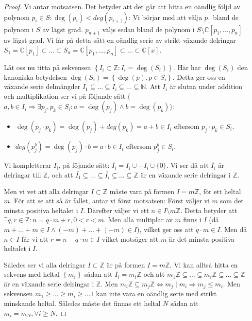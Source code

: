\begin{proof}
Vi antar motsatsen. Det betyder att det går att hitta en oändlig följd av polynom $p_i\in S:\deg(p_i)<deg(p_{i+1})$: Vi börjar med att välja $p_1$ bland de polynom i $S$ av lägst grad. $p_{n+1}$ väljs sedan bland de polynom i $S \setminus \mathbb{C}\left[p_1,\ldots,p_n\right]$ av lägst grad. Vi får på detta sätt en oändlig serie av strikt växande delringar $S_1=\mathbb{C}\left[p_1\right] \subset \ldots \subset S_n=\mathbb{C}\left[p_1,\ldots,p_n\right] \subset \ldots \subset \mathbb{C}\left[x\right]$.

Låt oss nu titta på sekvensen $\left\{I_i \subset \mathbb{Z}: I_i=\deg(S_i)\right\}$. Här har $\deg(S_i)$ den kanoniska betydelsen $\deg(S_i)=\left\{\deg(p), p \in S_i\right\}$. Detta ger oss en växande serie delmängder $I_1 \subseteq \ldots \subseteq I_i \subseteq \ldots \subseteq \mathbb{N}$. Att $I_i$ är slutna under addition och multiplikation ser vi på följande sätt ($a, b\in I_i \Longrightarrow \exists p_j, p_k \in S_i : a=\deg(p_j) \wedge b=\deg(p_k)$):

\begin{itemize}
\item $\deg(p_j \cdot p_k) = \deg(p_j)+deg(p_k) = a+b \in I_i$ eftersom $p_j \cdot p_k \in S_i$.

\item $deg(p_j^b) = \deg(p_j)\cdot b = a \cdot b \in I_i$ eftersom $p_j^b \in S_i$.
\end{itemize}

Vi kompletterar $I_i$, på föjande sätt: $\overline{I_i} = I_i \cup -I_i \cup \{0\}$. Vi ser då att $\overline{I_i}$ är delringar till $\mathbb{Z}$, och att $\overline{I_1} \subseteq \ldots \subseteq \overline{I_i} \subseteq \ldots \subseteq \mathbb{Z}$ är en växande serie delringar i $\mathbb{Z}$.

Men vi vet att alla delringar $I \subset \mathbb{Z}$ måste vara på formen $I=m\mathbb{Z}$, för ett heltal $m$. För att se att så är fallet, antar vi först motsatsen: Först väljer vi $m$ som det minsta positiva heltalet i $I$. Därefter väljer vi ett $n \in I\setminus m\mathbb{Z}$. Detta betyder att $\exists q, r \in \mathbb{Z}: n=q\cdot m + r, 0 < r < m$. Men alla multiplar av $m$ finns i $I$ (då $m+\ldots+m\in I \wedge (-m)+\ldots+(-m)\in I$), vilket ger oss att $q \cdot m \in I$. Men då $n\in I$ får vi att $r = n - q\cdot m \in I$ vilket motsäger att $m$ är det minsta positiva heltalet i $I$.

Således ser vi alla delringar $I \subset \mathbb{Z}$ är på formen $I=m\mathbb{Z}$. Vi kan alltså hitta en sekvens med heltal $\left\{m_i\right\}$ sådan att $\overline{I_i}=m_i\mathbb{Z}$ och att $m_1\mathbb{Z} \subseteq \ldots \subseteq m_i\mathbb{Z} \subseteq \ldots \subseteq \mathbb{Z}$ är en växande serie delringar i $\mathbb{Z}$. Men $m_i\mathbb{Z} \subseteq m_j\mathbb{Z} \Longleftrightarrow m_j \mid m_i \Longrightarrow m_j \leq m_i$. Men sekvensen $m_1 \geq \ldots \geq m_i \geq \ldots 1$ kan inte vara en oändlig serie med strikt minskande heltal. Således måste det finnas ett heltal $N$ sådan att $m_i = m_N, \forall i \geq N$.


\end{proof}
